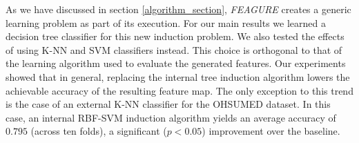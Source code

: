 \documentclass[letterpaper]{article} %
\theoremstyle{definition}
\begin{document}
As we have discussed in section \ref{algorithm_section}, \emph{FEAGURE} creates a generic learning problem as part of its execution. For our main results we learned a decision tree classifier for this new induction problem.
We also tested the effects of using K-NN and SVM classifiers instead. %
This choice is orthogonal to that of the learning algorithm used to evaluate the generated features.
Our experiments showed that in general, replacing the internal tree induction algorithm lowers the achievable accuracy of the resulting feature map.
The only exception to this trend is the case of an external K-NN classifier for the OHSUMED dataset. In this case, an internal RBF-SVM induction algorithm yields an average accuracy of $0.795$ (across ten folds), a significant ($p<0.05$) improvement over the baseline. 

		
		
		
		
		
\end{document}
